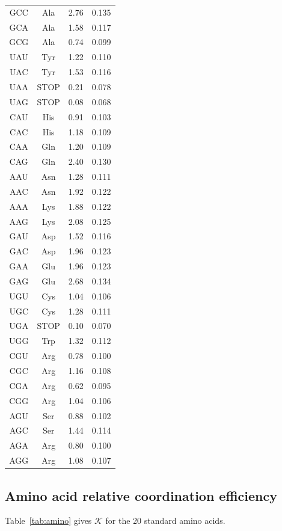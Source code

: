 \documentclass[12pt,a4paper]{article}
\newcommand{\REL}{\mathcal{K}}          %
\begin{document}
\begin{longtable}{|c|c|c|c|}
		GCC & Ala & 2.76 & 0.135 \\
		GCA & Ala & 1.58 & 0.117 \\
		GCG & Ala & 0.74 & 0.099 \\
		UAU & Tyr & 1.22 & 0.110 \\
		UAC & Tyr & 1.53 & 0.116 \\
		UAA & STOP & 0.21 & 0.078 \\
		UAG & STOP & 0.08 & 0.068 \\
		CAU & His & 0.91 & 0.103 \\
		CAC & His & 1.18 & 0.109 \\
		CAA & Gln & 1.20 & 0.109 \\
		CAG & Gln & 2.40 & 0.130 \\
		AAU & Asn & 1.28 & 0.111 \\
		AAC & Asn & 1.92 & 0.122 \\
		AAA & Lys & 1.88 & 0.122 \\
		AAG & Lys & 2.08 & 0.125 \\
		GAU & Asp & 1.52 & 0.116 \\
		GAC & Asp & 1.96 & 0.123 \\
		GAA & Glu & 1.96 & 0.123 \\
		GAG & Glu & 2.68 & 0.134 \\
		UGU & Cys & 1.04 & 0.106 \\
		UGC & Cys & 1.28 & 0.111 \\
		UGA & STOP & 0.10 & 0.070 \\
		UGG & Trp & 1.32 & 0.112 \\
		CGU & Arg & 0.78 & 0.100 \\
		CGC & Arg & 1.16 & 0.108 \\
		CGA & Arg & 0.62 & 0.095 \\
		CGG & Arg & 1.04 & 0.106 \\
		AGU & Ser & 0.88 & 0.102 \\
		AGC & Ser & 1.44 & 0.114 \\
		AGA & Arg & 0.80 & 0.100 \\
		AGG & Arg & 1.08 & 0.107 \\
		\hline
	\end{longtable}
	
	\subsection{Amino acid relative coordination efficiency}
	\label{sec:aminoacids}
	Table~\ref{tab:amino} gives \(\REL\) for the 20 standard amino acids.
	
\end{document}
